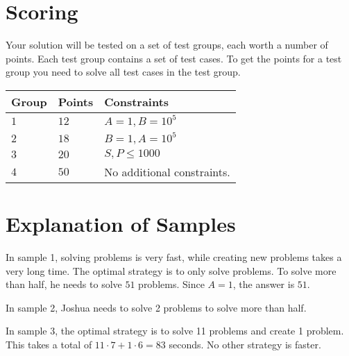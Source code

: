 \section*{Scoring}
Your solution will be tested on a set of test groups, each worth a number of points. Each test group contains
a set of test cases. To get the points for a test group you need to solve all test cases in the test group.

\noindent
\begin{tabular}{| l | l | p{12cm} |}
  \hline
  \textbf{Group} & \textbf{Points} & \textbf{Constraints} \\ \hline
  $1$    & $12$       & $A=1, B=10^5$ \\ \hline
  $2$    & $18$       & $B=1, A=10^5$ \\ \hline
  $3$    & $20$       & $S, P \leq 1000$ \\ \hline
  $4$    & $50$       & No additional constraints. \\ \hline
\end{tabular}

\section*{Explanation of Samples}
In sample 1, solving problems is very fast, while creating new problems takes a very long time. The optimal strategy 
is to only solve problems. To solve more than half, he needs to solve $51$ problems. Since $A=1$, the answer is $51$.

In sample 2, Joshua needs to solve 2 problems to solve more than half.

In sample 3, the optimal strategy is to solve 11 problems and create 1 problem. This takes a total of 
$11 \cdot 7 + 1 \cdot 6 = 83$ seconds. No other strategy is faster.
